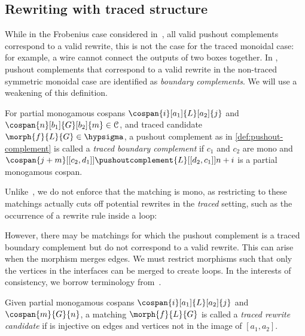 \subsection{Rewriting with traced structure}

While in the Frobenius case considered in~\cite{bonchi2022string}, all valid
pushout complements correspond to a valid rewrite, this is not the case for the
traced monoidal case: for example, a wire cannot connect the outputs of two
boxes together.
In \cite{bonchi2021string}, pushout complements that correspond to a valid
rewrite in the non-traced symmetric monoidal case are identified as
\emph{boundary complements}.
We will use a weakening of this definition.

\begin{definition}
    \label{def:traced-boundary-complement}
    For partial monogamous cospans \(
        \cospan{i}[a_1]{L}[a_2]{j}
    \) and \(
        \cospan{n}[b_1]{G}[b_2]{m} \in \mathcal{C}
    \), and traced candidate \(
        \morph{f}{L}{G} \in \hypsigma
    \), a pushout complement as in \cref{def:pushout-complement} is called a
    \emph{traced boundary complement} if \(c_1\) and \(c_2\) are mono and \(
        \cospan{j+m}[[c_2,d_1]]{\pushoutcomplement{L}}[[d_2,c_1]]{{n+i}}
    \) is a partial monogamous cospan.
\end{definition}

Unlike~\cite{bonchi2021string}, we do not enforce that the matching is mono,
as restricting to these matchings actually cuts off potential rewrites in the
\emph{traced} setting, such as the occurrence of a rewrite rule inside a loop:
\begin{center}
\end{center}

However, there may be matchings for which the pushout complement is a traced
boundary complement but do not correspond to a valid rewrite.
This can arise when the morphism merges edges.
We must restrict morphisms such that only the vertices in the interfaces can be
merged to create loops.
In the interests of consistency, we borrow terminology
from~\cite{milosavljevic2022string}.

\begin{definition}
    Given partial monogamous cospans \(\cospan{i}[a_1]{L}[a_2]{j}\) and
    \(\cospan{m}{G}{n}\), a matching \(\morph{f}{L}{G}\) is called a
    \emph{traced rewrite candidate} if is injective on edges and vertices not
    in the image of \([a_1,a_2]\).
\end{definition}

